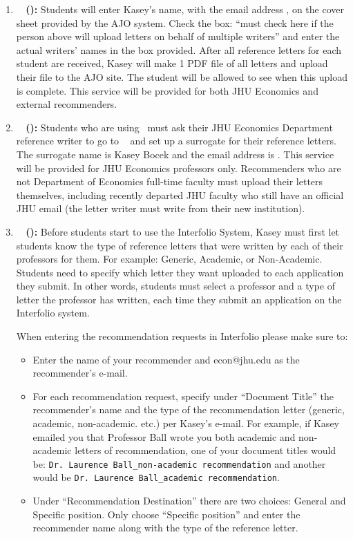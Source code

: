 \documentclass{econtex}
\begin{document}
\begin{enumerate}
\begin{itemize}
\end{itemize}

\item {\bf \AJO ~ (\AJOLink):}
Students will enter Kasey's name, with the email address \JMStaffEmail, on the cover sheet provided by the AJO system. Check the box: ``must check here if the person above will upload letters on behalf of multiple writers'' and enter the actual writers' names in the box provided. After all reference letters for each student are received, Kasey will make 1 PDF file of all letters and upload their file to the AJO site. The student will be allowed to see when this upload is complete. This service will be provided for both JHU Economics and external recommenders.

\item {\bf \AEA ~ (\AEALink):}
Students who are using \AEA~must ask their JHU Economics Department reference writer to go to \AEARecLink~ and set up a surrogate for their reference letters. The surrogate name is Kasey Bocek and the email address is \JMStaffEmail. This service will be provided for JHU Economics professors only. Recommenders who are not Department of Economics full-time faculty must upload their letters themselves, including recently departed JHU faculty who still have an official JHU email (the letter writer must write from their new institution).


\item {\bf \Interfolio ~ (\InterfolioLink):}
Before students start to use the Interfolio System, Kasey must first let students know the type of reference letters that were written by each of their professors for them. For example: Generic, Academic, or Non-Academic. Students need to specify which letter they want uploaded to each application they submit. In other words, students must select a professor and a type of letter the professor has written, each time they submit an application on the Interfolio system.

When entering the recommendation requests in Interfolio please make sure to:
\begin{itemize}
\item Enter the name of your recommender and econ@jhu.edu as the recommender's e-mail.
\item For each recommendation request, specify under ``Document Title'' the recommender's name and the type of the recommendation letter (generic, academic, non-academic. etc.) per Kasey's e-mail.
For example, if Kasey emailed you that Professor Ball wrote you both academic and non-academic letters of recommendation, one of your document titles would be: \texttt{Dr. Laurence Ball\_non-academic recommendation} and another would be \texttt{Dr. Laurence Ball\_academic recommendation}.
\item Under ``Recommendation Destination'' there are two choices: General and Specific position. Only choose ``Specific position'' and enter the recommender name along with the type of the reference letter.
\end{itemize}


\end{enumerate}
\end{document}
